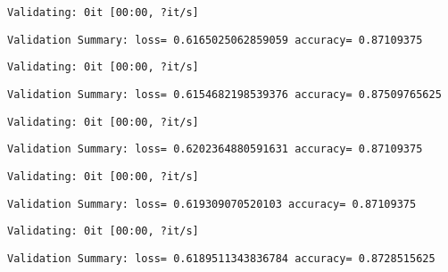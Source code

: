 \documentclass[11pt]{article}
\begin{document}
    
    \begin{Verbatim}[commandchars=\\\{\}]
Validating: 0it [00:00, ?it/s]
    \end{Verbatim}

    
    \begin{Verbatim}[commandchars=\\\{\}]
Validation Summary: loss= 0.6165025062859059 accuracy= 0.87109375
    \end{Verbatim}

    
    \begin{Verbatim}[commandchars=\\\{\}]
Validating: 0it [00:00, ?it/s]
    \end{Verbatim}

    
    \begin{Verbatim}[commandchars=\\\{\}]
Validation Summary: loss= 0.6154682198539376 accuracy= 0.87509765625
    \end{Verbatim}

    
    \begin{Verbatim}[commandchars=\\\{\}]
Validating: 0it [00:00, ?it/s]
    \end{Verbatim}

    
    \begin{Verbatim}[commandchars=\\\{\}]
Validation Summary: loss= 0.6202364880591631 accuracy= 0.87109375
    \end{Verbatim}

    
    \begin{Verbatim}[commandchars=\\\{\}]
Validating: 0it [00:00, ?it/s]
    \end{Verbatim}

    
    \begin{Verbatim}[commandchars=\\\{\}]
Validation Summary: loss= 0.619309070520103 accuracy= 0.87109375
    \end{Verbatim}

    
    \begin{Verbatim}[commandchars=\\\{\}]
Validating: 0it [00:00, ?it/s]
    \end{Verbatim}

    
    \begin{Verbatim}[commandchars=\\\{\}]
Validation Summary: loss= 0.6189511343836784 accuracy= 0.8728515625
    \end{Verbatim}
\end{document}
